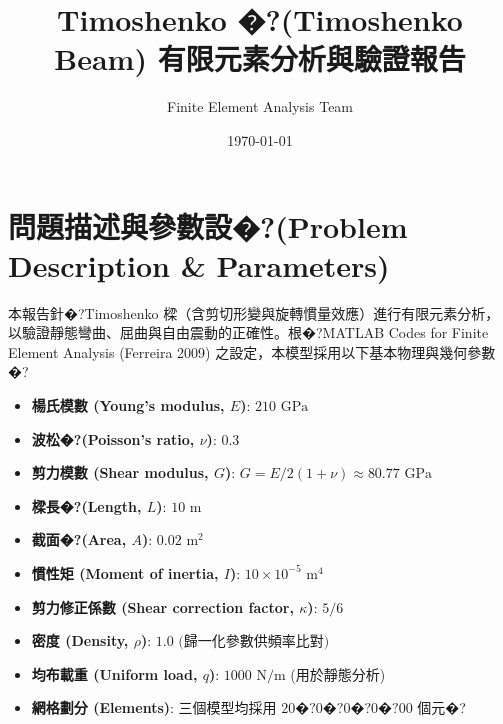 \documentclass[UTF8, a4paper, 12pt]{ctexart}
\title{\textbf{Timoshenko �?(Timoshenko Beam) 有限元素分析與驗證報告}}
\author{Finite Element Analysis Team}
\date{\today}
\begin{document}
\maketitle



\section{問題描述與參數設�?(Problem Description \& Parameters)}



本報告針�?Timoshenko 樑（含剪切形變與旋轉慣量效應）進行有限元素分析，以驗證靜態彎曲、屈曲與自由震動的正確性。根�?MATLAB Codes for Finite Element Analysis (Ferreira 2009) 之設定，本模型採用以下基本物理與幾何參數�?



\begin{itemize}

    \item \textbf{楊氏模數 (Young's modulus, $E$)}: $210 \text{ GPa}$

    \item \textbf{波松�?(Poisson's ratio, $\nu$)}: $0.3$

    \item \textbf{剪力模數 (Shear modulus, $G$)}: $G = E / 2(1+\nu) \approx 80.77 \text{ GPa}$

    \item \textbf{樑長�?(Length, $L$)}: $10 \text{ m}$

    \item \textbf{截面�?(Area, $A$)}: $0.02 \text{ m}^2$

    \item \textbf{慣性矩 (Moment of inertia, $I$)}: $10 \times 10^{-5} \text{ m}^4$

    \item \textbf{剪力修正係數 (Shear correction factor, $\kappa$)}: $5/6$

    \item \textbf{密度 (Density, $\rho$)}: $1.0\text{ (歸一化參數供頻率比對)}$

    \item \textbf{均布載重 (Uniform load, $q$)}: $1000 \text{ N/m}$ (用於靜態分析)

    \item \textbf{網格劃分 (Elements)}: 三個模型均採用 $20�?0�?0�?0�?00$ 個元�?

\end{itemize}
\end{document}
